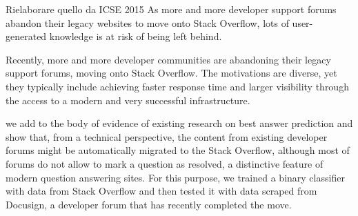 Rielaborare quello da ICSE 2015
As more and more developer support forums abandon their legacy websites to move onto Stack Overflow, lots of user-generated knowledge is at risk of being left behind.

Recently, more and more developer communities are abandoning their legacy support forums, moving onto Stack Overflow. The motivations are diverse, yet they typically include achieving faster response time and larger visibility through the access to a modern and very successful infrastructure.

we add to the body of evidence of existing research on best answer prediction and show that, from a technical perspective, the content from existing developer forums might be automatically migrated to the Stack Overflow, although most of forums do not allow to mark a question as resolved, a distinctive feature of modern question answering sites. For this purpose, we trained a binary classifier with data from Stack Overflow and then tested it with data scraped from Docusign, a developer forum that has recently completed the move. 
